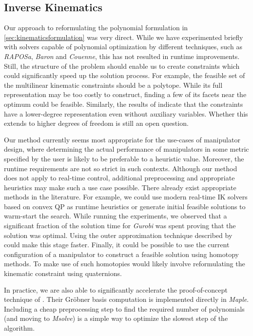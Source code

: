 \documentclass[../main.tex]{subfiles}
\begin{document}
\subsection*{Inverse Kinematics}
Our approach to reformulating the polynomial formulation in \cref{sec:kinematicsformulation} was very direct. While we have experimented briefly with solvers capable of polynomial optimization by different techniques, such as \emph{RAPOSa}, \emph{Baron} and \emph{Couenne}, this has not resulted in runtime improvements. Still, the structure of the problem should enable us to create constraints which could significantly speed up the solution process. For example, the feasible set of the multilinear kinematic constraints should be a polytope. While its full representation may be too costly to construct, finding a few of its facets near the optimum could be feasible. Similarly, the results of \textcite{trutman2022globally} indicate that the constraints have a lower-degree representation even without auxiliary variables. Whether this extends to higher degrees of freedom is still an open question.

Our method currently seems most appropriate for the use-cases of manipulator design, where determining the actual performance of manipulators in some metric specified by the user is likely to be preferable to a heuristic value. Moreover, the runtime requirements are not so strict in such contexts. Although our method does not apply to real-time control, additional preprocessing and appropriate heuristics may make such a use case possible. There already exist appropriate methods in the literature. For example, we could use modern real-time IK solvers based on convex QP as runtime heuristics or generate initial feasible solutions to warm-start the search. While running the experiments, we observed that a significant fraction of the solution time for \emph{Gurobi} was spent proving that the solution was optimal. Using the outer approximation technique described by \textcite{Dai2019-uf} could make this stage faster. Finally, it could be possible to use the current configuration of a manipulator to construct a feasible solution using homotopy methods. To make use of such homotopies would likely involve reformulating the kinematic constraint using quaternions.

In practice, we are also able to significantly accelerate the proof-of-concept technique of \textcite{trutman2022globally}. Their Gröbner basis computation is implemented directly in \emph{Maple}. Including a cheap preprocessing step to find the required number of polynomials (and moving to \emph{Msolve}) is a simple way to optimize the slowest step of the algorithm.
\end{document}
